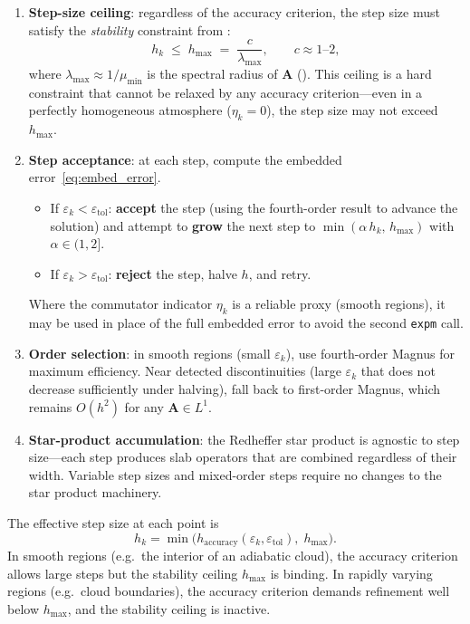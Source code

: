 \documentclass[11pt,a4paper]{article}
\newcommand{\mat}[1]{\mathbf{#1}}
\theoremstyle{definition}
\begin{document}
\begin{enumerate}
\item \textbf{Step-size ceiling}: regardless of the accuracy criterion,
  the step size must satisfy the \emph{stability} constraint from
  :
  \begin{equation}\label{eq:h_max}
    h_k \;\leq\; h_{\max} \;=\; \frac{c}{\lambda_{\max}},
    \qquad c \approx 1\text{--}2,
  \end{equation}
  where $\lambda_{\max}\approx 1/\mu_{\min}$ is the spectral radius of
  $\mat{A}$ ().  This ceiling is a hard constraint
  that cannot be relaxed by any accuracy criterion---even in a perfectly
  homogeneous atmosphere ($\eta_k=0$), the step size may not exceed
  $h_{\max}$.

\item \textbf{Step acceptance}: at each step, compute the embedded
  error~\eqref{eq:embed_error}.
  \begin{itemize}[nosep]
  \item If $\varepsilon_k < \varepsilon_{\text{tol}}$: \textbf{accept}
    the step (using the fourth-order result to advance the solution) and
    attempt to \textbf{grow} the next step to
    $\min(\alpha\,h_k,\,h_{\max})$ with $\alpha\in(1,2]$.
  \item If $\varepsilon_k > \varepsilon_{\text{tol}}$: \textbf{reject}
    the step, halve $h$, and retry.
  \end{itemize}
  Where the commutator indicator $\eta_k$ is a reliable proxy (smooth
  regions), it may be used in place of the full embedded error to avoid
  the second \texttt{expm} call.

\item \textbf{Order selection}: in smooth regions (small
  $\varepsilon_k$), use fourth-order Magnus for maximum efficiency.
  Near detected discontinuities (large $\varepsilon_k$ that does not
  decrease sufficiently under halving), fall back to first-order Magnus,
  which remains $O(h^2)$ for any $\mat{A}\in L^1$.

\item \textbf{Star-product accumulation}: the Redheffer star product is
  agnostic to step size---each step produces slab operators that are
  combined regardless of their width.  Variable step sizes and
  mixed-order steps require no changes to the star product machinery.
\end{enumerate}

The effective step size at each point is
\begin{equation}\label{eq:h_effective}
  h_k = \min\bigl(h_{\text{accuracy}}(\varepsilon_k,
  \varepsilon_{\text{tol}}),\;h_{\max}\bigr).
\end{equation}
In smooth regions (e.g.\ the interior of an adiabatic cloud), the
accuracy criterion allows large steps but the stability ceiling
$h_{\max}$ is binding.  In rapidly varying regions (e.g.\ cloud
boundaries), the accuracy criterion demands refinement well below
$h_{\max}$, and the stability ceiling is inactive.
\end{document}
